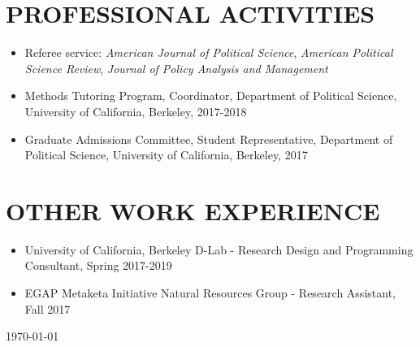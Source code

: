 \documentclass[11pt]{article}
\begin{document}
\section*{PROFESSIONAL ACTIVITIES}


\begin{itemize}	
\item[]Referee service: \textit{American Journal of Political Science}, \textit{American Political Science Review}, \textit{Journal of Policy Analysis and Management}
\item[]Methods Tutoring Program, Coordinator, Department of Political Science, University of California, Berkeley, 2017-2018
\item[]Graduate Admissions Committee, Student Representative, Department of Political Science, University of California, Berkeley, 2017
\end{itemize}



\section*{OTHER WORK EXPERIENCE}
	\begin{itemize}
	\item[]University of California, Berkeley D-Lab - Research Design and Programming Consultant, Spring 2017-2019
	\item[]EGAP Metaketa Initiative Natural Resources Group - Research Assistant, Fall 2017
\end{itemize}




\vspace*{\fill}

 \today
\end{document}
